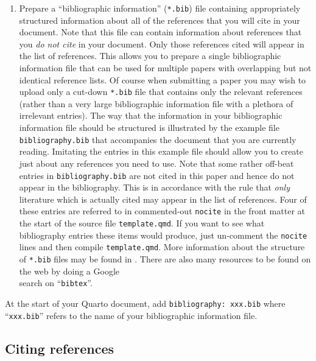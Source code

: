 \documentclass[
doublespace,
  times]{anzsauth}
\providecommand{\tightlist}{%
  \setlength{\itemsep}{0pt}\setlength{\parskip}{0pt}}\usepackage{longtable,booktabs,array}
\begin{document}
\begin{enumerate}
\def\labelenumi{\arabic{enumi}.}
\tightlist
\item
  Prepare a ``bibliographic information'' (\texttt{*.bib}) file
  containing appropriately structured information about all of the
  references that you will cite in your document. Note that this file
  can contain information about references that you \emph{do not cite}
  in your document. Only those references cited will appear in the list
  of references. This allows you to prepare a single bibliographic
  information file that can be used for multiple papers with overlapping
  but not identical reference lists. Of course when submitting a paper
  you may wish to upload only a cut-down \texttt{*.bib} file that
  contains only the relevant references (rather than a very large
  bibliographic information file with a plethora of irrelevant entries).
  \newline The way that the information in your bibliographic
  information file should be structured is illustrated by the example
  file \texttt{bibliography.bib} that accompanies the document that you
  are currently reading. Imitating the entries in this example file
  should allow you to create just about any references you need to use.
  Note that some rather off-beat entries in \texttt{bibliography.bib}
  are not cited in this paper and hence do not appear in the
  bibliography. This is in accordance with the rule that \emph{only}
  literature which is actually cited may appear in the list of
  references. Four of these entries are referred to in commented-out
  \texttt{nocite} in the front matter at the start of the source file
  \texttt{template.qmd}. If you want to see what bibliography entries
  these items would produce, just un-comment the \texttt{nocite} lines
  and then compile \texttt{template.qmd}. More information about the
  structure of \texttt{*.bib} files may be found in
  \citet{MittelbachGoossens2004}. There are also many resources to be
  found on the web by doing a Google\texttrademark\\
  search on ``\texttt{bibtex}''.
\end{enumerate}

At the start of your Quarto document, add
\texttt{bibliography:\ xxx.bib} where ``\texttt{xxx.bib}'' refers to the
name of your bibliographic information file.

\subsection{Citing references}\label{sec-citRef}
\end{document}

